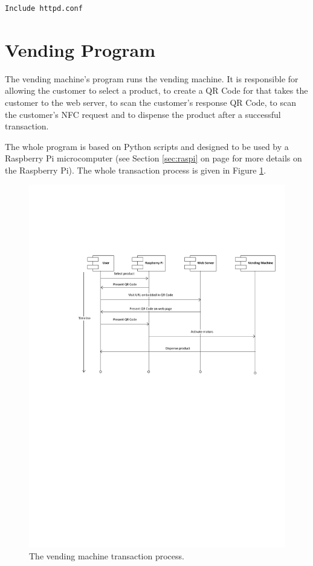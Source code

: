 \begin{verbatim}
Include httpd.conf
\end{verbatim}

\section{Vending Program}

The vending machine's program runs the vending machine. It is responsible for
allowing the customer to select a product, to create a QR Code for that takes the customer
to the web server, to scan the customer's response QR Code, to scan the customer's NFC
request and to dispense the product after a successful transaction. 

The whole program is based on Python scripts and
designed to be used by a Raspberry Pi microcomputer (see Section
\ref{sec:raspi} on page \pageref{sec:raspi} for more details on the Raspberry Pi). The whole
transaction process is given in Figure \ref{fig:vm_prog_interaction}.

\begin{figure}
 \centering 
 \includegraphics[clip=true, trim = 50 400 0 140, scale=0.7]{qrcode_processflow_user}
 \caption{The vending machine transaction process.}
 \label{fig:vm_prog_interaction}
\end{figure}

